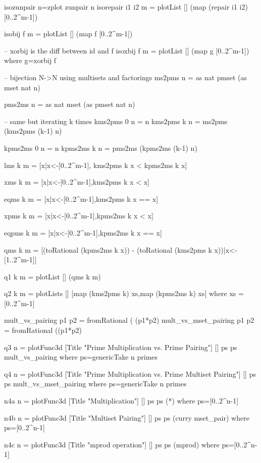 \documentclass[]{INCLUDES/llncs}
\begin{document}
\begin{code}
isozunpair n=zplot zunpair n
isorepair i1 i2 m = plotList [] (map (repair i1 i2) [0..2^m-1])

isobij f m = plotList [] (map f [0..2^m-1])

-- xorbij is the diff between id and f 
isoxbij f m = plotList [] (map g [0..2^m-1]) where g=xorbij f

-- bijection N->N using multisets and factorings
ms2pms n = as nat pmset (as mset nat n)

pms2ms n = as nat mset (as pmset nat n)

-- same but iterating k times
kms2pms 0 n = n
kms2pms k n = ms2pms (kms2pms (k-1) n) 

kpms2ms 0 n = n
kpms2ms k n = pms2ms (kpms2ms (k-1) n) 

lms k m = [x|x<-[0..2^m-1], kms2pms k x < kpms2ms k x]

xms k m = [x|x<-[0..2^m-1],kms2pms k x < x]

eqms k m = [x|x<-[0..2^m-1],kms2pms k x == x]

xpms k m = [x|x<-[0..2^m-1],kpms2ms k x < x]

eqpms k m = [x|x<-[0..2^m-1],kpms2ms k x == x]

qms k m = 
 [(toRational (kpms2ms k x)) - (toRational (kms2pms k x))|x<-[1..2^m-1]]

q1 k m = plotList []  (qms k m)

q2 k m = plotLists []  
  [map (kms2pms k) xs,map (kpms2ms k) xs] where 
    xs = [0..2^m-1]

mult_vs_pairing p1 p2 = fromRational ( (p1*p2) %
mult_vs_mset_pairing p1 p2 = fromRational ((p1*p2) %


q3 n = plotFunc3d 
        [Title "Prime Multiplication vs. Prime Pairing"] [] 
          ps ps  mult_vs_pairing where
            ps=genericTake n primes

q4 n = plotFunc3d 
  [Title "Prime Multiplication vs. Prime Multiset Pairing"] [] 
        ps ps mult_vs_mset_pairing where
        ps=genericTake n primes
       
n4a n = plotFunc3d [Title "Multiplication"] [] 
        ps ps (*) where
          ps=[0..2^n-1]

n4b n = plotFunc3d [Title "Multiset Pairing"] [] 
        ps ps (curry mset_pair) where
          ps=[0..2^n-1]


n4c n = plotFunc3d [Title "mprod operation"] [] 
        ps ps (mprod) where
          ps=[0..2^n-1]


\end{code}
\end{document}
